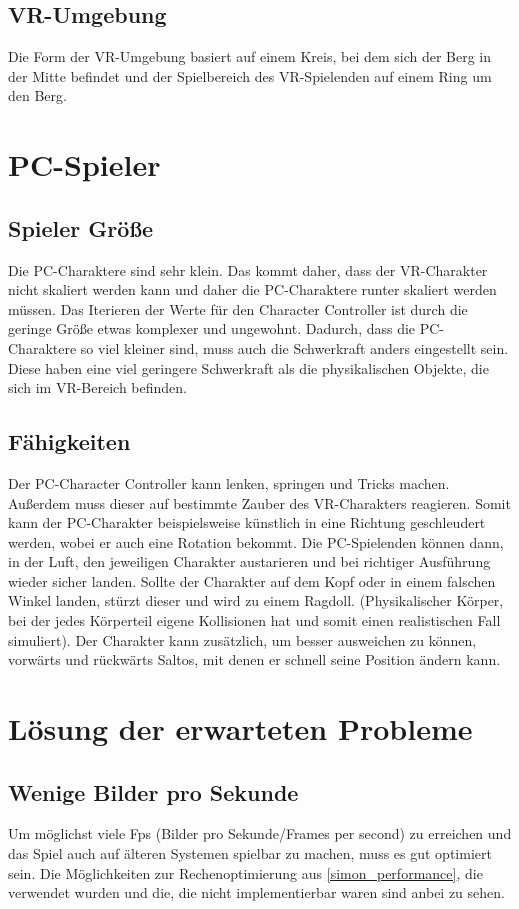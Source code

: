 \subsection{VR-Umgebung}
Die Form der VR-Umgebung basiert auf einem Kreis, bei dem sich der Berg in der Mitte befindet und der Spielbereich des VR-Spielenden auf einem Ring um den Berg.

\section{PC-Spieler}
\subsection{Spieler Größe}
Die PC-Charaktere sind sehr klein. Das kommt daher, dass der VR-Charakter nicht skaliert werden kann und daher die PC-Charaktere runter skaliert werden müssen. Das Iterieren der Werte für den Character Controller ist durch die geringe Größe etwas komplexer und ungewohnt. Dadurch, dass die PC-Charaktere so viel kleiner sind, muss auch die Schwerkraft anders eingestellt sein. Diese haben eine viel geringere Schwerkraft als die physikalischen Objekte, die sich im VR-Bereich befinden.

\subsection{Fähigkeiten}
Der PC-Character Controller kann lenken, springen und Tricks machen. Außerdem muss dieser auf bestimmte Zauber des VR-Charakters reagieren. Somit kann der PC-Charakter beispielsweise künstlich in eine Richtung geschleudert werden, wobei er auch eine Rotation bekommt. Die PC-Spielenden können dann, in der Luft, den jeweiligen Charakter austarieren und bei richtiger Ausführung wieder sicher landen. Sollte der Charakter auf dem Kopf oder in einem falschen Winkel landen, stürzt dieser und wird zu einem Ragdoll. (Physikalischer Körper, bei der jedes Körperteil eigene Kollisionen hat und somit einen realistischen Fall simuliert).
Der Charakter kann zusätzlich, um besser ausweichen zu können, vorwärts und rückwärts Saltos, mit denen er schnell seine Position ändern kann.


\section{Lösung der erwarteten Probleme}\label{simon_problems}

\subsection{Wenige Bilder pro Sekunde}
Um möglichst viele Fps (Bilder pro Sekunde/Frames per second) zu erreichen und das Spiel auch auf älteren Systemen spielbar zu machen, muss es gut optimiert sein. Die Möglichkeiten zur Rechenoptimierung aus \ref{simon_performance}, die verwendet wurden und die, die nicht implementierbar waren sind anbei zu sehen.

